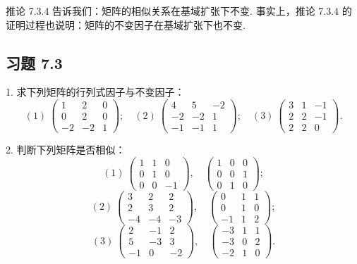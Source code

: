 \documentclass[UTF8, 12pt, fontset=fandol, oneside]{ctexart}
\begin{document}
推论 7.3.4 告诉我们：矩阵的相似关系在基域扩张下不变. 事实上，推论 7.3.4 的证明过程也说明：矩阵的不变因子在基域扩张下也不变.

\subsection*{习题 7.3}

1. 求下列矩阵的行列式因子与不变因子：
\[
(1)\ \left(\begin{array}{ccc}
1 & 2 & 0\\
0 & 2 & 0\\
-2 & -2 & 1
\end{array}\right);\quad
(2)\ \left(\begin{array}{ccc}
4 & 5 & -2\\
-2 & -2 & 1\\
-1 & -1 & 1
\end{array}\right);\quad
(3)\ \left(\begin{array}{ccc}
3 & 1 & -1\\
2 & 2 & -1\\
2 & 2 & 0
\end{array}\right).
\]

2. 判断下列矩阵是否相似：
\[
(1)\ \left(\begin{array}{ccc}
1 & 1 & 0\\
0 & 1 & 0\\
0 & 0 & -1
\end{array}\right),\quad
\left(\begin{array}{ccc}
1 & 0 & 0\\
0 & 0 & 1\\
0 & 1 & 0
\end{array}\right);
\]
\[
(2)\ \left(\begin{array}{ccc}
3 & 2 & 2\\
2 & 3 & 2\\
-4 & -4 & -3
\end{array}\right),\quad
\left(\begin{array}{ccc}
0 & 1 & 1\\
0 & 1 & 0\\
-1 & 1 & 2
\end{array}\right);
\]
\[
(3)\ \left(\begin{array}{ccc}
2 & -1 & 2\\
5 & -3 & 3\\
-1 & 0 & -2
\end{array}\right),\quad
\left(\begin{array}{ccc}
-3 & 1 & 1\\
-3 & 0 & 2\\
-2 & 1 & 0
\end{array}\right).
\]
\end{document}
